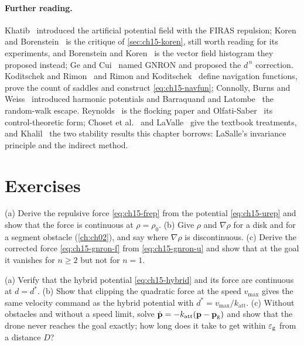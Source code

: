 \paragraph{Further reading.}
Khatib~\cite{khatib1986realtime} introduced the artificial potential field
with the FIRAS repulsion; Koren and Borenstein~\cite{koren1991potential} is
the critique of \cref{sec:ch15-koren}, still worth reading for its
experiments, and Borenstein and Koren~\cite{borenstein1991vfh} is the vector
field histogram they proposed instead; Ge and Cui~\cite{ge2000new} named GNRON and proposed the
$d^{\,n}$ correction. Koditschek and Rimon~\cite{koditschek1990navigation}
and Rimon and Koditschek~\cite{rimon1992exact} define navigation functions,
prove the count of saddles and construct \cref{eq:ch15-navfun}; Connolly,
Burns and Weiss~\cite{connolly1990laplace} introduced harmonic potentials
and Barraquand and Latombe~\cite{barraquand1991distributed} the random-walk
escape. Reynolds~\cite{reynolds1987flocks} is the flocking paper and
Olfati-Saber~\cite{olfatisaber2006flocking} its control-theoretic form;
Choset et al.~\cite[ch.~4]{choset2005principles} and
LaValle~\cite{lavalle2006planning} give the textbook treatments, and
Khalil~\cite{khalil2002nonlinear} the two stability results this chapter
borrows: LaSalle's invariance principle and the indirect method.

\section{Exercises}
\label{sec:ch15-exercises}

\begin{exercise}
\label{exr:ch15-derivation}
(a) Derive the repulsive force \cref{eq:ch15-frep} from the potential
\cref{eq:ch15-urep} and show that the force is continuous at $\rho =
\rho_0$. (b) Give $\rho$ and $\nabla\rho$ for a disk and for a segment
obstacle (\cref{ch:ch02}), and say where $\nabla\rho$ is discontinuous. (c) Derive the corrected
force \cref{eq:ch15-gnron-f} from \cref{eq:ch15-gnron-u} and show that at
the goal it vanishes for $n \ge 2$ but not for $n = 1$.
\end{exercise}

\begin{exercise}[\difficulty{1}]
\label{exr:ch15-conic}
(a) Verify that the hybrid potential \cref{eq:ch15-hybrid} and its force are
continuous at $d = d^*$. (b) Show that clipping the quadratic force at the
speed $v_{\max}$ gives the same velocity command as the hybrid potential with
$d^* = v_{\max}/k_{\mathrm{att}}$. (c) Without obstacles and without a speed
limit, solve $\dot{\mathbf{p}} = -k_{\mathrm{att}} (\mathbf{p} - \mathbf{p}_{\mathrm{g}})$ and
show that the drone never reaches the goal exactly; how long does it take to
get within $\varepsilon_{\mathrm{g}}$ from a distance $D$?
\end{exercise}

